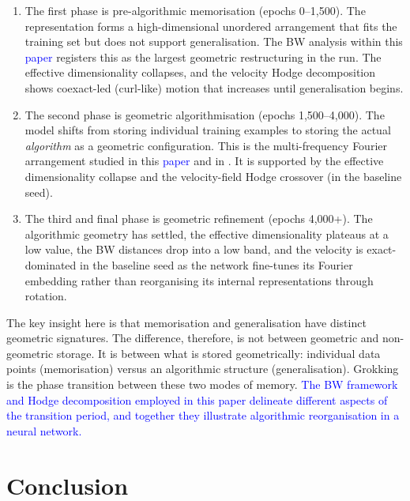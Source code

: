 \documentclass[11pt]{article}
\newcommand{\addedtext}[1]{\textcolor{blue}{#1}}
\theoremstyle{remark}
\begin{document}
\begin{enumerate}
    \item The first phase is pre-algorithmic memorisation (epochs 0--1{,}500). The representation forms a high-dimensional unordered arrangement that fits the training set but does not support generalisation. The BW analysis within this \addedtext{paper} registers this as the largest geometric restructuring in the run. The effective dimensionality collapses, and the velocity Hodge decomposition shows coexact-led (curl-like) motion that increases until generalisation begins.

    \item The second phase is geometric algorithmisation (epochs 1{,}500--4{,}000). The model shifts from storing individual training examples to storing the actual \emph{algorithm} as a geometric configuration. This is the multi-frequency Fourier arrangement studied in this \addedtext{paper} and in \citet{nanda2023progress}. It is supported by the effective dimensionality collapse and the velocity-field Hodge crossover (in the baseline seed).

    \item The third and final phase is geometric refinement (epochs 4{,}000+). The algorithmic geometry has settled, the effective dimensionality plateaus at a low value, the BW distances drop into a low band, and the velocity is exact-dominated in the baseline seed as the network fine-tunes its Fourier embedding rather than reorganising its internal representations through rotation.
\end{enumerate}

The key insight here is that memorisation and generalisation have distinct geometric signatures. The difference, therefore, is not between geometric and non-geometric storage. It is between what is stored geometrically: individual data points (memorisation) versus an algorithmic structure (generalisation). Grokking is the phase transition between these two modes of memory. \addedtext{The BW framework and Hodge decomposition employed in this paper delineate different aspects of the transition period, and together they illustrate algorithmic reorganisation in a neural network.}

\section{Conclusion}
\end{document}
